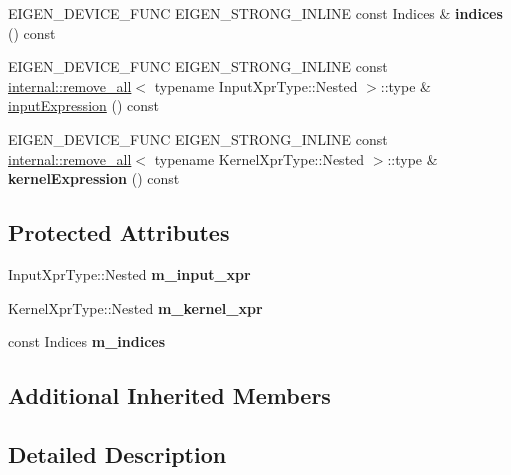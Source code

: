 \begin{DoxyCompactItemize}
E\+I\+G\+E\+N\+\_\+\+D\+E\+V\+I\+C\+E\+\_\+\+F\+U\+NC E\+I\+G\+E\+N\+\_\+\+S\+T\+R\+O\+N\+G\+\_\+\+I\+N\+L\+I\+NE const Indices \& {\bfseries indices} () const
\item 
E\+I\+G\+E\+N\+\_\+\+D\+E\+V\+I\+C\+E\+\_\+\+F\+U\+NC E\+I\+G\+E\+N\+\_\+\+S\+T\+R\+O\+N\+G\+\_\+\+I\+N\+L\+I\+NE const \hyperlink{struct_eigen_1_1internal_1_1remove__all}{internal\+::remove\+\_\+all}$<$ typename Input\+Xpr\+Type\+::\+Nested $>$\+::type \& \hyperlink{class_eigen_1_1_tensor_convolution_op_a57097fbe6e0a033d587e98654f0bd664}{input\+Expression} () const
\item 
\mbox{\label{class_eigen_1_1_tensor_convolution_op_aeba694de8119c33273e368ef85eb77c3}} 
E\+I\+G\+E\+N\+\_\+\+D\+E\+V\+I\+C\+E\+\_\+\+F\+U\+NC E\+I\+G\+E\+N\+\_\+\+S\+T\+R\+O\+N\+G\+\_\+\+I\+N\+L\+I\+NE const \hyperlink{struct_eigen_1_1internal_1_1remove__all}{internal\+::remove\+\_\+all}$<$ typename Kernel\+Xpr\+Type\+::\+Nested $>$\+::type \& {\bfseries kernel\+Expression} () const
\end{DoxyCompactItemize}
\subsection*{Protected Attributes}
\begin{DoxyCompactItemize}
\item 
\mbox{\label{class_eigen_1_1_tensor_convolution_op_aca54455edd0a3014f789e648a92c41c4}} 
Input\+Xpr\+Type\+::\+Nested {\bfseries m\+\_\+input\+\_\+xpr}
\item 
\mbox{\label{class_eigen_1_1_tensor_convolution_op_af1ae04bab308f919c67693ba729db914}} 
Kernel\+Xpr\+Type\+::\+Nested {\bfseries m\+\_\+kernel\+\_\+xpr}
\item 
\mbox{\label{class_eigen_1_1_tensor_convolution_op_a7fce16a8515d6f4896b6a42cfa82a6ea}} 
const Indices {\bfseries m\+\_\+indices}
\end{DoxyCompactItemize}
\subsection*{Additional Inherited Members}


\subsection{Detailed Description}
